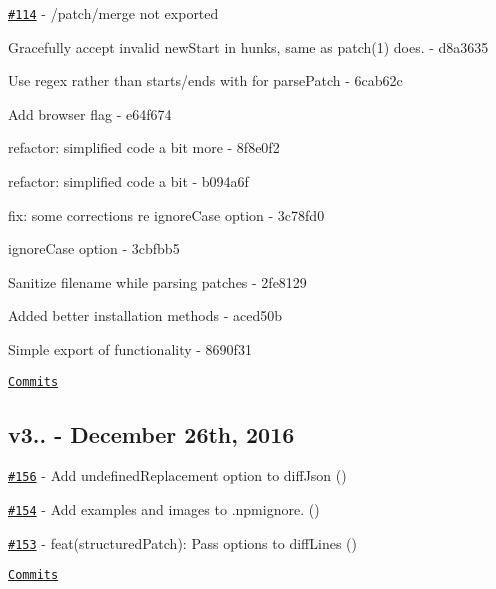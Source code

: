 \begin{DoxyItemize}
\item \href{https://github.com/kpdecker/jsdiff/issues/114}{\tt \#114} -\/ /patch/merge not exported
\item Gracefully accept invalid new\+Start in hunks, same as patch(1) does. -\/ d8a3635
\item Use regex rather than starts/ends with for parse\+Patch -\/ 6cab62c
\item Add browser flag -\/ e64f674
\item refactor\+: simplified code a bit more -\/ 8f8e0f2
\item refactor\+: simplified code a bit -\/ b094a6f
\item fix\+: some corrections re ignore\+Case option -\/ 3c78fd0
\item ignore\+Case option -\/ 3cbfbb5
\item Sanitize filename while parsing patches -\/ 2fe8129
\item Added better installation methods -\/ aced50b
\item Simple export of functionality -\/ 8690f31
\end{DoxyItemize}

\href{https://github.com/kpdecker/jsdiff/compare/v3.2.0...v3.3.0}{\tt Commits}

\subsection*{v3.. -\/ December 26th, 2016}


\begin{DoxyItemize}
\item \href{https://github.com/kpdecker/jsdiff/pull/156}{\tt \#156} -\/ Add {\ttfamily undefined\+Replacement} option to {\ttfamily diff\+Json} (\href{https://api.github.com/users/ewnd9}{\tt })
\item \href{https://github.com/kpdecker/jsdiff/pull/154}{\tt \#154} -\/ Add {\ttfamily examples} and {\ttfamily images} to {\ttfamily .npmignore}. (\href{https://api.github.com/users/wtgtybhertgeghgtwtg}{\tt })
\item \href{https://github.com/kpdecker/jsdiff/pull/153}{\tt \#153} -\/ feat(structured\+Patch)\+: Pass options to diff\+Lines (\href{https://api.github.com/users/Kiougar}{\tt })
\end{DoxyItemize}

\href{https://github.com/kpdecker/jsdiff/compare/v3.1.0...v3.2.0}{\tt Commits}

